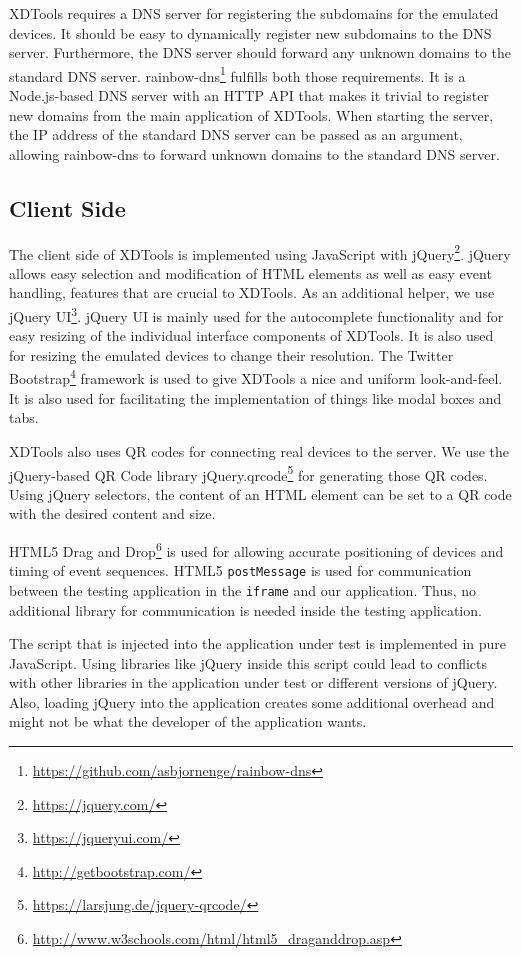 XDTools requires a DNS server for registering the subdomains for the emulated devices. It should be easy to dynamically register new subdomains to the DNS server. Furthermore, the DNS server should forward any unknown domains to the standard DNS server. rainbow-dns\footnote{\url{https://github.com/asbjornenge/rainbow-dns}} fulfills both those requirements. It is a Node.js-based DNS server with an HTTP API that makes it trivial to register new domains from the main application of XDTools. When starting the server, the IP address of the standard DNS server can be passed as an argument, allowing rainbow-dns to forward unknown domains to the standard DNS server.

\subsection{Client Side}

The client side of XDTools is implemented using JavaScript with jQuery\footnote{\url{https://jquery.com/}}. jQuery allows easy selection and modification of HTML elements as well as easy event handling, features that are crucial to XDTools. As an additional helper, we use jQuery UI\footnote{\url{https://jqueryui.com/}}. jQuery UI is mainly used for the autocomplete functionality and for easy resizing of the individual interface components of XDTools. It is also used for resizing the emulated devices to change their resolution. The Twitter Bootstrap\footnote{\url{http://getbootstrap.com/}} framework is used to give XDTools a nice and uniform look-and-feel. It is also used for facilitating the implementation of things like modal boxes and tabs. 

XDTools also uses QR codes for connecting real devices to the server. We use the jQuery-based QR Code library jQuery.qrcode\footnote{\url{https://larsjung.de/jquery-qrcode/}} for generating those QR codes. Using jQuery selectors, the content of an HTML element can be set to a QR code with the desired content and size.

HTML5 Drag and Drop\footnote{\url{http://www.w3schools.com/html/html5_draganddrop.asp}} is used for allowing accurate positioning of devices and timing of event sequences. HTML5 \lstinline|postMessage| is used for communication between the testing application in the \lstinline|iframe| and our application. Thus, no additional library for communication is needed inside the testing application.

The script that is injected into the application under test is implemented in pure JavaScript. Using libraries like jQuery inside this script could lead to conflicts with other libraries in the application under test or different versions of jQuery. Also, loading jQuery into the application creates some additional overhead and might not be what the developer of the application wants.

